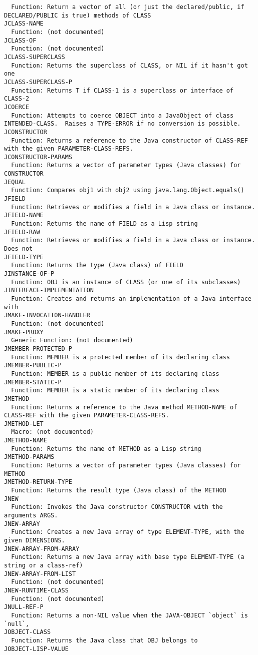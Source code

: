 \begin{verbatim}
  Function: Return a vector of all (or just the declared/public, if DECLARED/PUBLIC is true) methods of CLASS
JCLASS-NAME
  Function: (not documented)
JCLASS-OF
  Function: (not documented)
JCLASS-SUPERCLASS
  Function: Returns the superclass of CLASS, or NIL if it hasn't got one
JCLASS-SUPERCLASS-P
  Function: Returns T if CLASS-1 is a superclass or interface of CLASS-2
JCOERCE
  Function: Attempts to coerce OBJECT into a JavaObject of class INTENDED-CLASS.  Raises a TYPE-ERROR if no conversion is possible.
JCONSTRUCTOR
  Function: Returns a reference to the Java constructor of CLASS-REF with the given PARAMETER-CLASS-REFS.
JCONSTRUCTOR-PARAMS
  Function: Returns a vector of parameter types (Java classes) for CONSTRUCTOR
JEQUAL
  Function: Compares obj1 with obj2 using java.lang.Object.equals()
JFIELD
  Function: Retrieves or modifies a field in a Java class or instance.
JFIELD-NAME
  Function: Returns the name of FIELD as a Lisp string
JFIELD-RAW
  Function: Retrieves or modifies a field in a Java class or instance. Does not
JFIELD-TYPE
  Function: Returns the type (Java class) of FIELD
JINSTANCE-OF-P
  Function: OBJ is an instance of CLASS (or one of its subclasses)
JINTERFACE-IMPLEMENTATION
  Function: Creates and returns an implementation of a Java interface with
JMAKE-INVOCATION-HANDLER
  Function: (not documented)
JMAKE-PROXY
  Generic Function: (not documented)
JMEMBER-PROTECTED-P
  Function: MEMBER is a protected member of its declaring class
JMEMBER-PUBLIC-P
  Function: MEMBER is a public member of its declaring class
JMEMBER-STATIC-P
  Function: MEMBER is a static member of its declaring class
JMETHOD
  Function: Returns a reference to the Java method METHOD-NAME of CLASS-REF with the given PARAMETER-CLASS-REFS.
JMETHOD-LET
  Macro: (not documented)
JMETHOD-NAME
  Function: Returns the name of METHOD as a Lisp string
JMETHOD-PARAMS
  Function: Returns a vector of parameter types (Java classes) for METHOD
JMETHOD-RETURN-TYPE
  Function: Returns the result type (Java class) of the METHOD
JNEW
  Function: Invokes the Java constructor CONSTRUCTOR with the arguments ARGS.
JNEW-ARRAY
  Function: Creates a new Java array of type ELEMENT-TYPE, with the given DIMENSIONS.
JNEW-ARRAY-FROM-ARRAY
  Function: Returns a new Java array with base type ELEMENT-TYPE (a string or a class-ref)
JNEW-ARRAY-FROM-LIST
  Function: (not documented)
JNEW-RUNTIME-CLASS
  Function: (not documented)
JNULL-REF-P
  Function: Returns a non-NIL value when the JAVA-OBJECT `object` is `null`,
JOBJECT-CLASS
  Function: Returns the Java class that OBJ belongs to
JOBJECT-LISP-VALUE

\end{verbatim}
